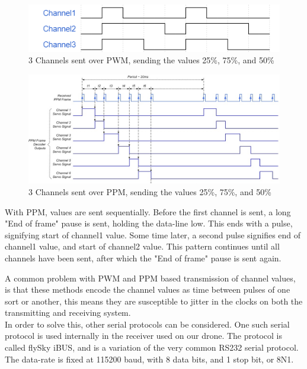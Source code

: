 \begin{figure}[h]
    \centering
    \includegraphics[width=0.8\columnwidth]{figures/PA/pwm.png}
    \caption{3 Channels sent over PWM, sending the values 25\%, 75\%, and 50\%}
    \label{fig:chan_pwm}
\end{figure}

\begin{figure}[h]
    \centering
    \includegraphics[width=0.8\columnwidth]{figures/PA/post-229-0-40047400-1404173046.jpg}
    \caption{3 Channels sent over PPM, sending the values 25\%, 75\%, and 50\%}
    \label{fig:chan_ppm}
\end{figure}
  
With PPM, values are sent sequentially. Before the first channel is sent, a long "End of frame" pause is sent, holding the data-line low. This ends with a pulse, signifying start of channel1 value. Some time later, a second pulse signifies end of channel1 value, and start of channel2 value. This pattern continues until all channels have been sent, after which the "End of frame" pause is sent again.

A common problem with PWM and PPM based transmission of channel values, is that these methods encode the channel values as time between pulses of one sort or another, this means they are susceptible to jitter in the clocks on both the transmitting and receiving system.\\
In order to solve this, other serial protocols can be considered.
One such serial protocol is used internally in the receiver used on our drone. The protocol is called flySky iBUS, and is a variation of the very common RS232 serial protocol. The data-rate is fixed at 115200 baud, with 8 data bits, and 1 stop bit, or 8N1.

